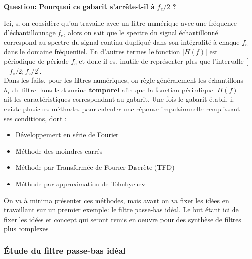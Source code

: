 \documentclass[11pt,a4paper]{article}
\begin{document}
\textbf{Question: Pourquoi ce gabarit s'arrête-t-il à $f_e/2$ ?}

Ici, si on considère qu'on travaille avec un filtre numérique avec une fréquence d'échantillonnage $f_e$, alors on sait que le spectre du signal échantillonné correspond au spectre du signal continu dupliqué dans son intégralité à chaque $f_e$ dans le domaine fréquentiel. En d'autres termes le fonction $|H(f)|$ est périodique de période $f_e$ et donc il est inutile de représenter plus que l'intervalle [$-f_e/2;f_e/2$].\\

Dans les faits, pour les filtres numériques, on règle généralement les échantillons $h_i$ du filtre dans le domaine \textbf{temporel} afin que la fonction périodique $|H(f)|$ ait les caractéristiques correspondant au gabarit. Une fois le gabarit établi, il existe plusieurs méthodes pour calculer une réponse impulsionnelle remplissant ses conditions, dont :
\begin{itemize}
\item Développement en série de Fourier
\item Méthode des moindres carrés
\item Méthode par Transformée de Fourier Discrète (TFD)
\item Méthode par approximation de Tchebychev
\end{itemize}

On va à minima présenter ces méthodes, mais avant on va fixer les idées en travaillant sur un premier exemple: le filtre passe-bas idéal. Le but étant ici de fixer les idées et concept qui seront remis en oeuvre pour des synthèse de filtres plus complexes

\subsubsection{Étude du filtre passe-bas idéal}

\begin{center}
\end{center}
\end{document}
